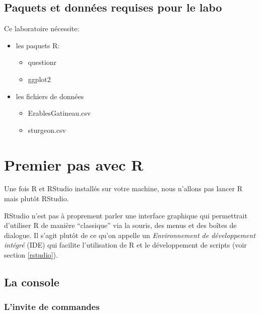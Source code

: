 \documentclass[12pt,]{book}
\providecommand{\tightlist}{%
  \setlength{\itemsep}{0pt}\setlength{\parskip}{0pt}}
\begin{document}
\hypertarget{set-intro}{%
\subsection{Paquets et données requises pour le labo}\label{set-intro}}

Ce laboratoire nécessite:

\begin{itemize}
\tightlist
\item
  les paquets R:

  \begin{itemize}
  \tightlist
  \item
    questionr
  \item
    ggplot2
  \end{itemize}
\item
  les fichiers de données

  \begin{itemize}
  \tightlist
  \item
    ErablesGatineau.csv
  \item
    sturgeon.csv
  \end{itemize}
\end{itemize}

\hypertarget{premier-pas-avec-r}{%
\section{Premier pas avec R}\label{premier-pas-avec-r}}

Une fois R et RStudio installés sur votre machine, nous n'allons pas lancer R mais plutôt RStudio.

RStudio n'est pas à proprement parler une interface graphique qui permettrait d'utiliser R de manière ``classique'' via la souris, des menus et des boîtes de dialogue. Il s'agit plutôt de ce qu'on appelle un \emph{Environnement de développement intégré} (IDE) qui facilite l'utilisation de R et le développement de scripts (voir section \ref{rstudio}).

\hypertarget{la-console}{%
\subsection{La console}\label{la-console}}

\hypertarget{linvite-de-commandes}{%
\subsubsection{L'invite de commandes}\label{linvite-de-commandes}}
\end{document}
